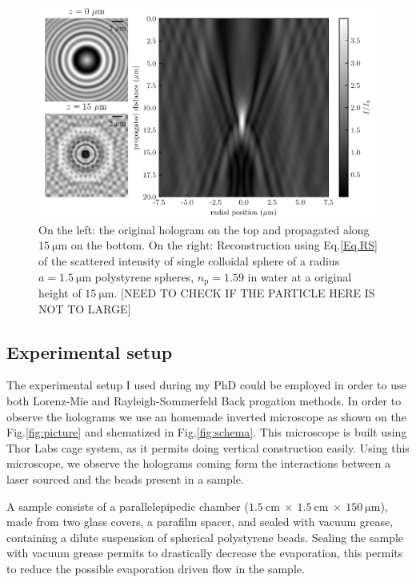 \begin{figure}[!ht]
	\centering
	\includegraphics{02_body/chapter2/images/Back-propagation/backpropagation.pdf}
	\caption{On the left: the original hologram on the top and propagated along $15 ~ \mathrm{\mu m}$ on the bottom. On the right: Reconstruction using Eq.\ref{Eq.RS} of the scattered intensity of single colloidal sphere of a radius $a = 1.5 ~ \mathrm{\mu m}$  polystyrene spheres, $n_\mathrm{p} = 1.59$ in water at a original height of $15 ~ \mathrm{\mu m}$. [NEED TO CHECK IF THE PARTICLE HERE IS NOT TO LARGE] }
	\label{fig.sommerfeld}
\end{figure}




\subsection{Experimental setup}
\label{chap:exp-setup}

The experimental setup I used during my PhD could be employed in order to use both Lorenz-Mie and Rayleigh-Sommerfeld Back progation methods. In order to observe the holograms we use an homemade inverted microscope as shown on the Fig.\ref{fig:picture} and shematized in Fig.\ref{fig:schema}. This microscope is built using Thor Labs cage system, as it permits doing vertical construction easily. Using this microscope, we observe the holograms coming form the interactions between a laser sourced and the beads present in a sample.

A sample consists of a parallelepipedic chamber ($1.5 ~ \text{cm} ~ \times ~ 1.5 ~ \text{cm} ~ \times ~ 150 ~ \mathrm{\mu m} $), made from two glass covers, a parafilm spacer, and sealed with vacuum grease, containing a dilute suspension of spherical polystyrene beads. Sealing the sample with vacuum grease permits to drastically decrease the evaporation, this permits to reduce the possible evaporation driven flow in the sample.

